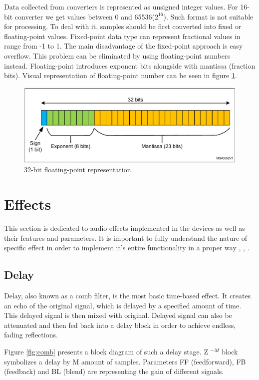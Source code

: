 \documentclass[a4paper,twoside,12pt]{book}
\begin{document}
Data collected from converters is represented as unsigned integer values.
For 16-bit converter we get values between 0 and 65536(\(2^{16}\)).
Such format is not suitable for processing.
To deal with it, samples should be first converted into fixed or floating-point values.
Fixed-point data type can represent fractional values in range from -1 to 1.
The main disadvantage of the fixed-point approach is easy overflow.
This problem can be eliminated by using floating-point numbers instead.
Floating-point introduces exponent bits alongside with mantissa (fraction bits).
Visual representation of floating-point number can be seen in figure \ref{fig:Float}.

\begin{figure}[H]
    \centering
    \includegraphics[width=\textwidth]{images/float}
    \caption{32-bit floating-point representation\cite{ST:DSP}.}
    \label{fig:Float}
\end{figure}

\section{Effects}
This section is dedicated to audio effects implemented in the devices
as well as their features and parameters.
It is important to fully understand the nature of specific effect
in order to implement it's entire functionality in a proper way
\cite{Zolzer1},
\cite{Zolzer2},
\cite{Smith}.

\subsection{Delay}
Delay, also known as a comb filter, is the most basic time-based effect.
It creates an echo of the original signal,
which is delayed by a specified amount of time.
This delayed signal is then mixed with original.
Delayed signal can also be attenuated and then fed back into a delay block
in order to achieve endless, fading reflections.

Figure \ref{fig:comb} presents a block diagram of such a delay stage.
Z \(^{-M}\) block symbolizes a delay by M amount of samples.
Parameters FF (feedforward), FB (feedback) and BL (blend)
are representing the gain of different signals.
\end{document}
